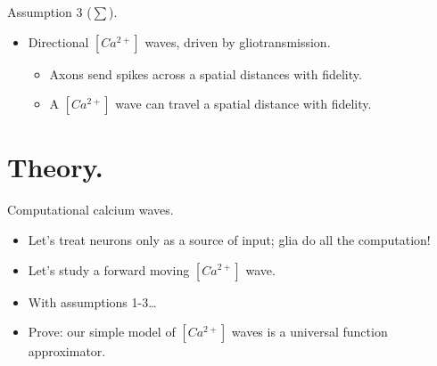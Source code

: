 \documentclass[10pt]{beamer}
\begin{document}
\begin{frame}[fragile]{Assumption 3 ($\sum$).}
\begin{itemize}
    \item \alert{Directional} $[Ca^{2+}]$ waves, driven by gliotransmission.
    \begin{itemize}
    \item Axons send spikes across a spatial distances with fidelity.
    \item A $[Ca^{2+}]$ wave can travel a spatial distance with fidelity.
    \end{itemize}
\end{itemize}
\end{frame}

\section[In theory.]{Theory.}
\begin{frame}[fragile]{Computational calcium waves.}
\begin{itemize}
\item Let's treat neurons only as a source of input; glia do all the computation!
\item Let's study a forward moving $[Ca^{2+}]$ wave.
\item With assumptions 1-3\ldots
\item \alert{Prove}: our simple model of $[Ca^{2+}]$ waves is a universal function approximator.
\end{itemize}
\end{frame}


\end{document}
